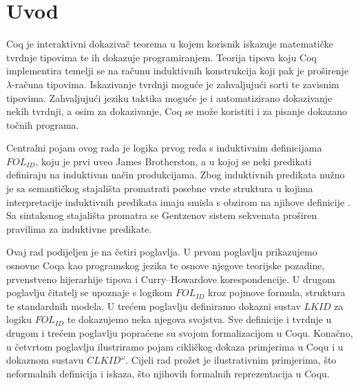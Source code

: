 \chapter{Uvod}\label{cha:uvod}
Coq je interaktivni dokazivač teorema u kojem
korisnik iskazuje matematičke tvrdnje tipovima te ih dokazuje programiranjem.
Teorija tipova koju Coq implementira temelji se na računu induktivnih konstrukcija
koji pak je proširenje \(\lambda\)-računa tipovima.
Iskazivanje tvrdnji moguće je zahvaljujući sorti \coqprop{} te zavisnim tipovima.
Zahvaljujući jeziku taktika moguće je i automatizirano dokazivanje nekih tvrdnji,
a osim za dokazivanje, Coq se može koristiti i za pisanje dokazano točnih programa.

Centralni pojam ovog rada je logika prvog reda s induktivnim definicijama
\(\mathit{FOL}_{\mathit{ID}}\), koju je prvi uveo James Brotherston, a u kojoj
se neki predikati definiraju na induktivan način produkcijama.
Zbog induktivnih predikata nužno je sa semantičkog stajališta promatrati
posebne vrste struktura u kojima interpretacije induktivnih predikata imaju smisla
s obzirom na njihove definicije .
Sa sintaksnog stajališta promatra se Gentzenov sistem sekvenata proširen
pravilima za induktivne predikate.

Ovaj rad podijeljen je na četiri poglavlja.
U prvom poglavlju prikazujemo osnovne Coqa kao programskog jezika te osnove njegove
teorijske pozadine, prvenstveno hijerarhije tipova i Curry--Howardove korespondencije.
U drugom poglavlju čitatelj se upoznaje s logikom \(\mathit{FOL}_{\mathit{ID}}\) kroz
pojmove formula, struktura te standardnih modela.
U trećem poglavlju definiramo dokazni sustav \(\mathit{LKID}\) za logiku \(\mathit{FOL}_{\mathit{ID}}\)
te dokazujemo neka njegova svojstva.
Sve definicije i tvrdnje u drugom i trećem poglavlju popraćene su svojom formalizacijom u Coqu.
Konačno, u četvrtom poglavlju ilustriramo pojam cikličkog dokaza primjerima u Coqu i u dokaznom
sustavu \(\mathit{CLKID}^{\omega}\).
Cijeli rad prožet je ilustrativnim primjerima, što neformalnih definicija i iskaza,
što njihovih formalnih reprezentacija u Coqu.



